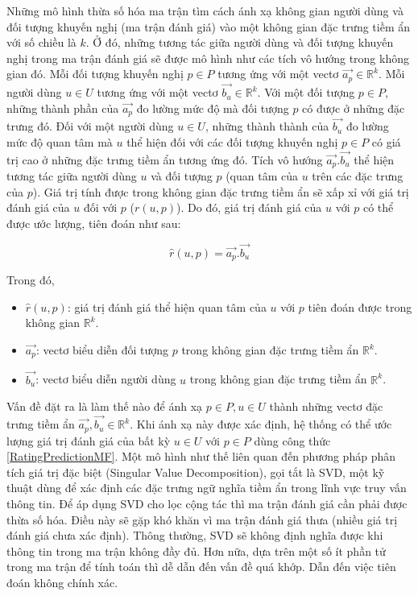 Những mô hình thừa số hóa ma trận tìm cách ánh xạ không gian người dùng và đối tượng khuyến nghị (ma trận đánh giá) vào một không gian đặc trưng tiềm ẩn với số chiều là $k$. Ở đó, những tương tác giữa người dùng và đối tượng khuyến nghị trong ma trận đánh giá sẽ được mô hình như các tích vô hướng trong không gian đó. Mỗi đối tượng khuyến nghị $p \in P$ tương ứng với một vectơ $\overrightarrow{a_{p}}\in \mathbb{R}^k$. Mỗi người dùng $u \in U$ tương ứng với một vectơ $\overrightarrow{b_u} \in \mathbb{R}^k$. Với một đối tượng $p \in P$, những thành phần của $\overrightarrow{a_{p}}$ đo lường mức độ mà đối tượng $p$ có được ở những đặc trưng đó. Đối với một người dùng $u \in U$, những thành thành của $\overrightarrow{b_u}$ đo lường mức độ quan tâm mà $u$ thể hiện đối với các đối tượng khuyến nghị $p \in P$ có giá trị cao ở những đặc trưng tiềm ẩn tương ứng đó. Tích vô hướng $\overrightarrow{a_{p}}.\overrightarrow{b_u}$ thể hiện tương tác giữa người dùng $u$ và đối tượng $p$ (quan tâm của $u$ trên các đặc trưng của $p$). Giá trị tính được trong không gian đặc trưng tiềm ẩn sẽ xấp xỉ với giá trị đánh giá của $u$ đối với $p$ ($r(u,p)$). Do đó, giá trị đánh giá của $u$ với $p$ có thể được ước lượng, tiên đoán như sau:

\begin{equation}\label{RatingPredictionMF}
\hat{r}(u,p) = \overrightarrow{a_{p}}.\overrightarrow{b_u}
\end{equation}

Trong đó,
\begin{itemize}
	\item $\hat{r}(u,p)$: giá trị đánh giá thể hiện quan tâm của $u$ với $p$ tiên đoán được trong không gian $\mathbb{R}^k$. 
	\item $\overrightarrow{a_{p}}$: vectơ biểu diễn đối tượng $p$ trong không gian đặc trưng tiềm ẩn $\mathbb{R}^k$.
	\item $\overrightarrow{b_{u}}$: vectơ biểu diễn người dùng $u$ trong không gian đặc trưng tiềm ẩn $\mathbb{R}^k$.
\end{itemize}

Vấn đề đặt ra là làm thế nào để ánh xạ $p \in P, u \in U$ thành những vectơ đặc trưng tiềm ẩn $\overrightarrow{a_{p}},\overrightarrow{b_{u}} \in \mathbb{R}^k$. Khi ánh xạ này được xác định, hệ thống có thể ước lượng giá trị đánh giá của bất kỳ $u \in U$ với $p \in P$ dùng công thức \ref{RatingPredictionMF}. Một mô hình như thế liên quan đến phương pháp phân tích giá trị đặc biệt (Singular Value Decomposition), gọi tắt là SVD, một kỹ thuật dùng để xác định các đặc trưng ngữ nghĩa tiềm ẩn trong lĩnh vực truy vấn thông tin. Để áp dụng SVD cho lọc cộng tác thì ma trận đánh giá cần phải được thừa số hóa. Điều này sẽ gặp khó khăn vì ma trận đánh giá thưa (nhiều giá trị đánh giá chưa xác định). Thông thường, SVD sẽ không định nghĩa được khi thông tin trong ma trận không đầy đủ. Hơn nữa, dựa trên một số ít phần tử trong ma trận để tính toán thì dễ dẫn đến vấn đề quá khớp. Dẫn đến việc tiên đoán không chính xác.

